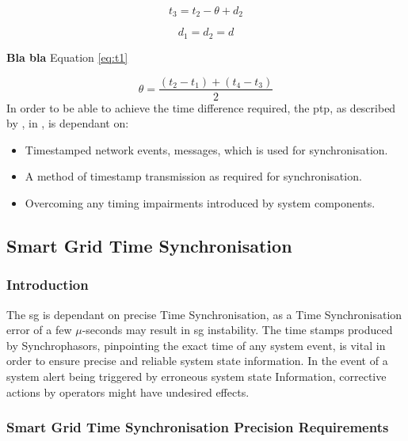 \begin{equation}
t_3 = t_2 - \theta + d_2
\end{equation}

\begin{equation}
d_1 = d_2 = d
\end{equation}

\textbf{Bla bla }Equation \ref{eq:t1}

\begin{equation}
\theta = \frac{(t_2 - t_1) + (t_4 - t_3)}{2} \label{eq:offset}
\end{equation}
In order to be able to achieve the time difference required, the \acrshort{ptp}, as described by  \citeauthor{Eidson2006}, in \cite{Eidson2006}, is dependant on:

\begin{itemize}
    \item Timestamped network events, messages, which is  used for synchronisation.
    \item A method of timestamp transmission as required for synchronisation.
    \item Overcoming any timing impairments introduced by system components.
\end{itemize}




\subsection{Smart Grid Time Synchronisation}



\subsubsection{Introduction}


The \acrlong{sg} is dependant on precise Time Synchronisation, as a Time Synchronisation error of a few $\mu$-seconds may result in \acrshort{sg} instability. The time stamps produced by Synchrophasors, pinpointing the exact time of any system event, is vital in order to ensure precise and reliable system state information.
In the event of a system alert being triggered by erroneous system state Information, corrective actions by operators might have undesired effects. 

\subsubsection[Smart Grid Time Sync Precision Requirements]{Smart Grid Time Synchronisation Precision Requirements}

